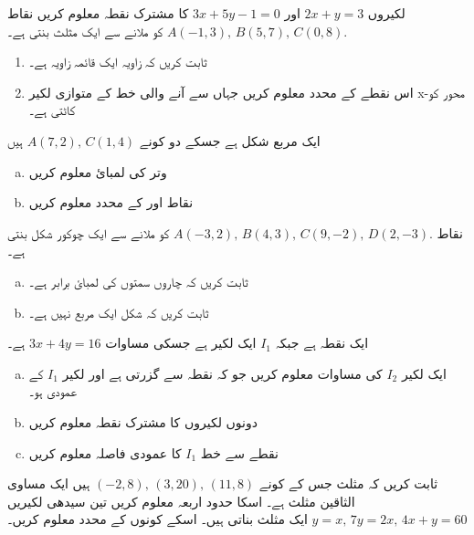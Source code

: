 لکیروں \( 2x+y = 3 \)  اور  \( 3x+5y -1 =0 \) کا مشترک نقطہ معلوم کریں
نقاط \( A(-1,3), \, B(5,7), \, C(0,8). \) کو ملانے سے ایک مثلث بنتی ہے۔
\begin{enumerate}
\item
ثابت کریں کہ زاویہ  ایک قائمہ زاویہ ہے۔ 
\item
اس نقطے کے محدد معلوم کریں جہاں سے آنے والی  خط    کے متوازی لکیر x-محور کو کاٹتی ہے۔
\end{enumerate}
ایک مربع شکل ہے جسکے دو کونے \( A(7,2), \, C(1,4) \)  ہیں 
\begin{multicols}{2}
\begin{enumerate}[a.]
\item
وتر  کی لمبائ معلوم کریں
\item
نقاط  اور کے محدد معلوم کریں
\end{enumerate}
\end{multicols}
نقاط \( A(-3,2), \, B(4,3), \, C(9,-2), \, D(2,-3). \) کو ملانے سے ایک چوکور شکل بنتی ہے۔
\begin{multicols}{2}
\begin{enumerate}[a.]
\item
ثابت کریں کہ چاروں سمتوں کی لمبائ برابر ہے۔
\item
ثابت کریں کہ شکل   ایک مربع نہیں ہے۔
\end{enumerate}
\end{multicols}
 ایک نقطہ ہے جبکہ  \( I_{1} \) ایک لکیر ہے جسکی مساوات \( 3x+4y=16 \) ہے۔
\begin{multicols}{2}
\begin{enumerate}[a.]
\item
ایک لکیر     \( I_{2} \)  کی مساوات معلوم کریں جو کہ نقطہ  سے گزرتی ہے اور لکیر  \( I_{1} \) کے عمودی ہو۔
\item
دونوں لکیروں کا مشترک نقطہ معلوم کریں
\item
نقطے  سے خط \( I_{1} \) کا عمودی فاصلہ معلوم کریں
\end{enumerate}
\end{multicols}
ثابت کریں کہ مثلث جس کے کونے \( (-2,8), \, (3,20), \, (11,8) \) ہیں ایک مساوی الثاقین مثلث ہے۔ اسکا حدود اربعہ معلوم کریں
تین سیدھی لکیریں \( y=x, \, 7y=2x, \, 4x+y =60 \) ایک مثلث بناتی ہیں۔ اسکے کونوں کے محدد معلوم کریں۔ 
